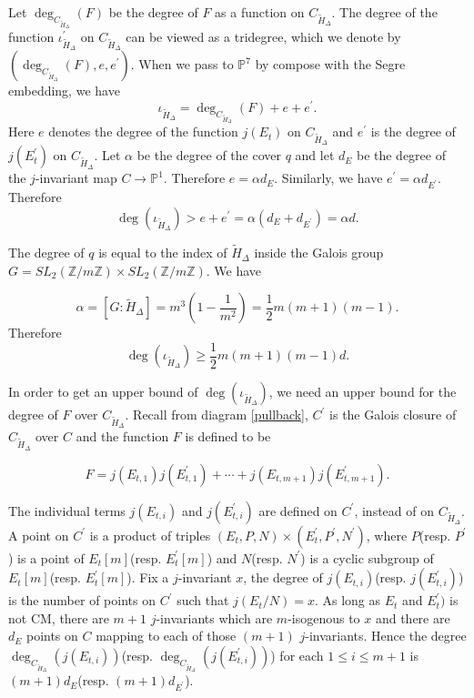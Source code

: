 \documentclass[12pt]{amsart}
\theoremstyle{definition}
\theoremstyle{remark}
\numberwithin{equation}{section}
\newcommand{\Z}{\mathbb{Z}}
\renewcommand{\P}{\mathbb{P}}
\begin{document}
Let $\deg_{C_{\tilde{H}_{\Delta}}}(F)$ be the degree of $F$ as a function on $C_{\tilde{H}_{\Delta}}$. The degree of the function $\iota_{\tilde{H}_{\Delta}}^{\prime}$ on $C_{\tilde{H}_{\Delta}}$ can be viewed as a tridegree, which we denote by $(\deg_{C_{\tilde{H}_{\Delta}}}(F),e, e^{\prime})$. When we pass to $\P^{7}$ by compose with the Segre embedding, we have $$\iota_{\tilde{H}_{\Delta}}=\deg_{C_{\tilde{H}_\Delta}}(F)+e+e^{\prime}.$$ Here $e$ denotes the degree of the function $j(E_{t})$ on $C_{\tilde{H}_{\Delta}}$ and $e^{\prime}$ is the degree of $j(E^{\prime}_{t})$ on  $C_{\tilde{H}_{\Delta}}$. Let $\alpha$ be the degree of the cover $q$ and let $d_{E}$ be the degree of the $j$-invariant map $C \to \P^{1}$. Therefore $e=\alpha d_{E}$. Similarly, we have $e^{\prime}=\alpha d_{E^{\prime}}.$ Therefore $$\deg(\iota_{\tilde{H}_{\Delta}}) > e+e^{\prime}=\alpha(d_{E}+d_{E^{\prime}})=\alpha d.$$    

The degree of $q$ is equal to the index of $\tilde{H}_{\Delta}$ inside the Galois group $G=SL_{2}(\Z/m\Z) \times SL_{2}(\Z/m\Z)$. We have 

$$\alpha = [G:\tilde{H}_{\Delta}] = m^{3}(1-\frac{1}{m^{2}})=\frac{1}{2}m(m+1)(m-1).$$	
Therefore
$$\operatorname{deg}(\iota_{\tilde{H}_{\Delta}}) \ge \frac{1}{2}m(m+1)(m-1)d.$$

In order to get an upper bound of $\deg(\iota_{\tilde{H}_{\Delta}})$, we need an upper bound for the degree of $F$ over $C_{\tilde{H}_{\Delta}}$. Recall from diagram \ref{pullback}, $C^{\prime}$ is the Galois closure of $C_{\tilde{H}_{\Delta}}$ over $C$ and the function $F$ is defined to be 

$$F=j(E_{t,1})j(E^{\prime}_{t,1})+ \cdots +j(E_{t, m+1})j(E^{\prime}_{t, m+1}).$$

The individual terms $j(E_{t,i})$ and $j(E^{\prime}_{t,i})$ are defined on $C^{\prime}$, instead of on $C_{\tilde{H}_{\Delta}}$. A point on $C^{\prime}$ is a product of triples $(E_{t}, P, N) \times (E^{\prime}_{t}, P^{\prime}, N^{\prime})$, where $P$(resp. $P^{\prime}$) is a point of $E_{t}[m]$(resp. $E_{t}^{\prime}[m]$) and $N$(resp. $N^{\prime}$) is a cyclic subgroup of $E_{t}[m]$(resp. $E_{t}^{\prime}[m]$). Fix a $j$-invariant $x$, the degree of $j(E_{t,i})$(resp. $j(E^{\prime}_{t,i})$) is the number of points on $C^{\prime}$ such that $j(E_{t}/N)=x$. As long as $E_t$ and $E_{t}^{\prime})$ is not CM, there are $m+1$ $j$-invariants which are $m$-isogenous to $x$ and there are $d_{E}$ points on $C$ mapping to each of those $(m+1)$ $j$-invariants. Hence the degree $\deg_{C_{\tilde{H}_\Delta}}(j(E_{t,i}))$(resp. $\deg_{C_{\tilde{H}_\Delta}}(j(E^{\prime}_{t,i}))$) for each $1 \le i \le m+1$ is $(m+1)d_{E}$(resp. $(m+1)d_{E^{\prime}}$).
\end{document}
